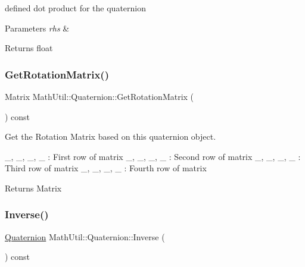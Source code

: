 defined dot product for the quaternion 


\begin{DoxyParams}{Parameters}
{\em rhs} & \\
\hline
\end{DoxyParams}
\begin{DoxyReturn}{Returns}
float 
\end{DoxyReturn}
\mbox{\label{structMathUtil_1_1Quaternion_a331cf32ec3767d734e0ad0ebc9e3cccb}} 
\subsubsection{\texorpdfstring{Get\+Rotation\+Matrix()}{GetRotationMatrix()}}
{\footnotesize\ttfamily Matrix Math\+Util\+::\+Quaternion\+::\+Get\+Rotation\+Matrix (\begin{DoxyParamCaption}{ }\end{DoxyParamCaption}) const\hspace{0.3cm}{\ttfamily [inline]}}



Get the Rotation Matrix based on this quaternion object. 

\+\_, \+\_, \+\_, \+\_ \+: First row of matrix \+\_, \+\_, \+\_, \+\_ \+: Second row of matrix \+\_, \+\_, \+\_, \+\_ \+: Third row of matrix \+\_, \+\_, \+\_, \+\_ \+: Fourth row of matrix \begin{DoxyReturn}{Returns}
Matrix 
\end{DoxyReturn}
\mbox{\label{structMathUtil_1_1Quaternion_aa66406ea6183ad19154410b2507567c2}} 
\subsubsection{\texorpdfstring{Inverse()}{Inverse()}}
{\footnotesize\ttfamily \hyperlink{structMathUtil_1_1Quaternion}{Quaternion} Math\+Util\+::\+Quaternion\+::\+Inverse (\begin{DoxyParamCaption}{ }\end{DoxyParamCaption}) const\hspace{0.3cm}{\ttfamily [inline]}}



